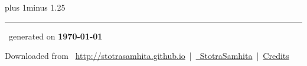 \documentclass[oneside,14pt]{book}
\makeatletter
\renewcommand\chapter{\resetShloka\@startsection {chapter}{1}{\z@}%
{10pt}
{2pt}
{\normalfont\Large\bfseries\filcenter}}
\makeatother
\begin{document}
\setmainfont[Script=Devanagari,Mapping=tex-text]{Siddhanta}
\font plus 1\font minus 1.25\font
\setlength{\emergencystretch}{3em}
\renewcommand{\sect}[1]{\newpage\chapter[#1]{॥#1॥}}
\makeatletter
  \def\vhrulefill#1{\leavevmode\leaders\hrule\@height#1\hfill \kern\z@}
\makeatother
{}
\newcommand{\ip}{\stepcounter{panchadi}}
\newcommand{\anuvakamend}[1][]{\refstepcounter{anuvakam}%
\baselineskip=12pt\ifthenelse{\equal{#1}{}}{\mbox{}}{{\scriptsize #1॥\devanumber{\arabic{panchadi}}॥}}\nolinebreak[4]\vhrulefill{1.6pt}\raisebox{-3pt}{\bfseries{[\devanumber{\arabic{anuvakam}}]}}%
\vspace{-1pt}\setcounter{panchadi}{0}
}
\newcommand{\prashnaend}[5]{\begingroup\scriptsize
{#1}\\#2\\#3%
\endgroup
\begin{center}
#4॥\\#5
\end{center}}

\vfill
\centering
\rule{0.8\textwidth}{0.6pt}

\footnotesize
{}\sffamily
\centerline{\faFilePdfO~generated on \textbf{\today}}
Downloaded from \faGlobe{}~\url{http://stotrasamhita.github.io}~|~\href{https://github.com/StotraSamhita}{\faGithubSquare{}~StotraSamhita}~|~\href{https://stotrasamhita.github.io/about/}{Credits}
\end{document}

